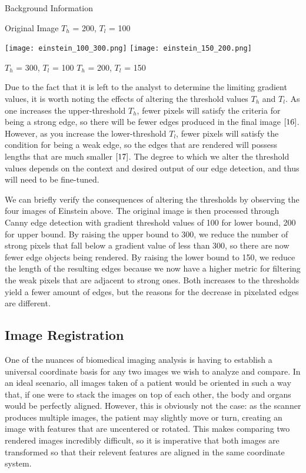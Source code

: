 \documentclass[a4paper,12pt]{article}
\begin{document}
\begin{section}{Background Information}
\begin{center}
Original Image \hspace{25mm} $T_h$ = 200, $T_l$ = 100
\end{center}
\begin{center}
\texttt{[image: einstein\_100\_300.png]}
\texttt{[image: einstein\_150\_200.png]}

$T_h$ = 300, $T_l$ = 100 \hspace{20mm} $T_h$ = 200, $T_l$ = 150
\end{center}

Due to the fact that it is left to the analyst to determine the limiting gradient values, it is worth noting the effects of altering the threshold values $T_h$ and $T_l$.
As one increases the upper-threshold $T_h$, fewer pixels will satisfy the criteria for being a strong edge, so there will be fewer edges produced in the final image $\cite{16}$.
However, as you increase the lower-threshold $T_l$, fewer pixels will satisfy the condition for being a weak edge, so the edges that are rendered will possess lengths that are much smaller $\cite{17}$.
The degree to which we alter the threshold values depends on the context and desired output of our edge detection, and thus will need to be fine-tuned. 

We can briefly verify the consequences of altering the thresholds by observing the four images of Einstein above. The original image is then processed through Canny edge detection with gradient threshold values of 100 for lower bound, 200 for upper bound. By raising the upper bound to 300, we reduce the number of strong pixels that fall below a gradient value of less than 300, so there are now fewer edge objects being rendered. By raising the lower bound to 150, we reduce the length of the resulting edges because we now have a higher metric for filtering the weak pixels that are adjacent to strong ones. Both increases to the thresholds yield a fewer amount of edges, but the reasons for the decrease in pixelated edges are different.

\subsection{Image Registration}

One of the nuances of biomedical imaging analysis is having to establish a universal coordinate basis for any two images we wish to analyze and compare. In an ideal scenario, all images taken of a patient would be oriented in such a way that, if one were to stack the images on top of each other, the body and organs would be perfectly aligned. However, this is obviously not the case: as the scanner produces multiple images, the patient may slightly move or turn, creating an image with features that are uncentered or rotated. This makes comparing two rendered images incredibly difficult, so it is imperative that both images are transformed so that their relevent features are aligned in the same coordinate system. 


\end{section}
\end{document}
